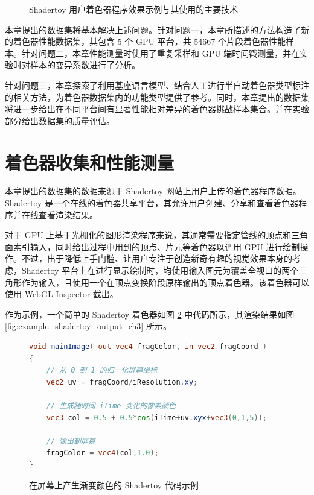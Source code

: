 {\begin{figure}[htbp]
  \caption{Shadertoy 用户\cite{ShdrToyUser1, ShdrToyUser2}着色器程序效果示例与其使用的主要技术}
  \label{fig:shadertoy_gallery_ch3}
\end{figure}


本章提出的数据集将基本解决上述问题。针对问题一，本章所描述的方法构造了新的着色器性能数据集，其包含 5 个 GPU 平台，共 54667 个片段着色器性能样本。针对问题二，本章性能测量时使用了重复采样和 GPU 端时间戳测量，并在实验时对样本的变异系数进行了分析。}{\added 针对问题三，本章探索了利用基座语言模型、结合人工进行半自动着色器类型标注的相关方法，为着色器数据集内的功能类型提供了参考。同时，本章提出的数据集将进一步给出在不同平台间有显著性能相对差异的着色器挑战样本集合。并在实验部分给出数据集的质量评估。
}

\section{着色器收集和性能测量}

{\added 本章提出的数据集的数据来源于 Shadertoy\cite{Shadertoy} 网站上用户上传的着色器程序数据。} Shadertoy 是一个在线{\added 的着色器共享}平台，{\amend 其}允许用户创建、分享和查看着色器程序{\amend 并在线查看}渲染结果。

{\added 对于 GPU 上基于光栅化的图形渲染程序来说，其通常需要}指定管线的顶点和三角面索引输入，同时给出过程中用到的顶点、片元等着色器{\amend 以调用 GPU 进行绘制操作。}不过，出于降低上手门槛、让用户专注于创造新奇有趣的视觉效果本身的考虑，Shadertoy 平台上在进行显示绘制时，均{\amend 使用输入图元为覆盖全视口的两个三角形作为输入，且使用一个在顶点变换阶段原样输出的顶点着色器。}{\added 该着色器可以使用 WebGL Inspector \cite{WebGLInspector} 截出。}

作为示例，一个简单的 Shadertoy 着色器如图 \ref{fig:example_glsl_shadertoy_code_ch3} 中代码所示，其渲染结果如图 \ref{fig:example_shadertoy_output_ch3} 所示。

\begin{figure}  %
\centering

\begin{lstlisting}[language=GLSL]
void mainImage( out vec4 fragColor, in vec2 fragCoord )
{
    // 从 0 到 1 的归一化屏幕坐标
    vec2 uv = fragCoord/iResolution.xy;

    // 生成随时间 iTime 变化的像素颜色
    vec3 col = 0.5 + 0.5*cos(iTime+uv.xyx+vec3(0,1,5));

    // 输出到屏幕
    fragColor = vec4(col,1.0);
}
\end{lstlisting}
\caption{在屏幕上产生渐变颜色的 Shadertoy 代码示例}
\label{fig:example_glsl_shadertoy_code_ch3}
\end{figure}

